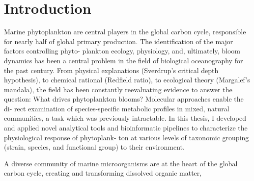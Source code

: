 
\chapter{Introduction}
\raggedbottom

Marine phytoplankton are central players in the global carbon cycle, responsible for nearly half of global primary production. The identification of the major factors controlling phyto- plankton ecology, physiology, and, ultimately, bloom dynamics has been a central problem in the field of biological oceanography for the past century. From physical explanations (Sverdrup’s critical depth hypothesis), to chemical rational (Redfield ratio), to ecological theory (Margalef’s mandala), the field has been constantly reevaluating evidence to answer the question: What drives phytoplankton blooms? Molecular approaches enable the di- rect examination of species-specific metabolic profiles in mixed, natural communities, a task which was previously intractable. In this thesis, I developed and applied novel analytical tools and bioinformatic pipelines to characterize the physiological response of phytoplank- ton at various levels of taxonomic grouping (strain, species, and functional group) to their environment.

A diverse community of marine microorganisms are at the heart of the global carbon cycle, creating and transforming dissolved organic matter, 


